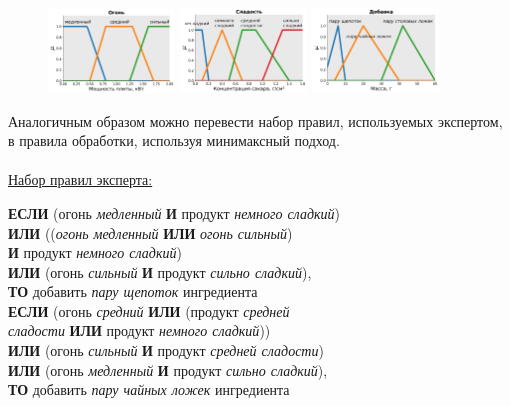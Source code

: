 \documentclass[a4paper,12pt]{article}
\begin{document}
	\begin{figure}
		\begin{floatrow}[3]
			\ffigbox{\caption{}\label{fig:3_1}}
			{\includegraphics[width=0.3\textwidth]{Figure_3_1}}
			\ffigbox{\caption{}\label{fig:3_2}}
			{\includegraphics[width=0.3\textwidth]{Figure_3_2}}  
			\ffigbox{\caption{}\label{fig:3_3}}
			{\includegraphics[width=0.3\textwidth]{Figure_3_3}}       
		\end{floatrow}
	\end{figure}
	Аналогичным образом можно перевести набор правил, используемых экспертом, в правила обработки, используя минимаксный подход.
	\\\\
	\underline{Набор правил эксперта:}
	
	\textbf{ЕСЛИ} (огонь \textit{медленный} \textbf{И} продукт \textit{немного сладкий})\\ \textbf{ИЛИ} ((\textit{огонь медленный} \textbf{ИЛИ} \textit{огонь сильный})\\ \textbf{И} продукт \textit{немного сладкий})\\ \textbf{ИЛИ} (огонь \textit{сильный} \textbf{И} продукт \textit{сильно сладкий}),\\ \textbf{ТО} добавить \textit{пару щепоток} ингредиента
	\\
	
	\textbf{ЕСЛИ} (огонь \textit{средний} \textbf{ИЛИ} (продукт \textit{средней\\ сладости} \textbf{ИЛИ} продукт \textit{немного сладкий}))\\ \textbf{ИЛИ} (огонь \textit{сильный} \textbf{И} продукт \textit{средней сладости})\\ \textbf{ИЛИ} (огонь \textit{медленный} \textbf{И} продукт \textit{сильно сладкий}),\\ \textbf{ТО} добавить \textit{пару чайных ложек} ингредиента
	\\
	
\end{document}

